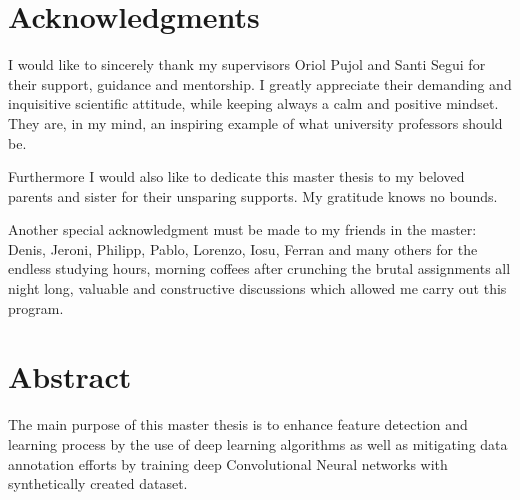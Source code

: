 \documentclass[11pt, oneside]{book}
\begin{document}
%
%
%
\setcounter{page}{3}

\thispagestyle{empty}

\thispagestyle{empty}
\chapter*{Acknowledgments}
\thispagestyle{empty}
I would like to sincerely thank my supervisors Oriol Pujol and Santi Segui for their support, guidance and mentorship. I greatly appreciate their demanding and inquisitive scientific attitude, while keeping always a calm and positive mindset. They are, in my mind, an inspiring example of what university professors should be.

Furthermore I would also like to dedicate this master thesis to my beloved parents and sister for their unsparing supports. My gratitude knows no bounds.

Another special acknowledgment must be made to my friends in the master: Denis, Jeroni, Philipp, Pablo, Lorenzo, Iosu, Ferran and many others for the endless studying hours, morning coffees after crunching the brutal assignments all night long, valuable and constructive discussions which allowed me carry out this program. 
 



\setcounter{page}{0}
\clearpage

\newpage
{} %
\chapter*{Abstract}
\thispagestyle{empty}
The main purpose of this master thesis is to enhance feature detection and learning process by the use of deep learning algorithms as well as mitigating data annotation efforts by training deep Convolutional Neural networks with synthetically created dataset. 
\end{document}
